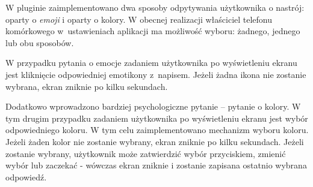 W pluginie zaimplementowano dwa sposoby odpytywania użytkownika o nastrój: oparty o \textit{emoji} i oparty o kolory. W obecnej realizacji właściciel telefonu komórkowego w~ustawieniach aplikacji ma możliwość wyboru: żadnego, jednego lub obu sposobów.

W przypadku pytania o emocje zadaniem użytkownika po wyświetleniu ekranu jest kliknięcie odpowiedniej emotikony z~napisem. Jeżeli żadna ikona nie zostanie wybrana, ekran zniknie po kilku sekundach.

Dodatkowo wprowadzono bardziej psychologiczne pytanie -- pytanie o kolory. W tym drugim przypadku zadaniem użytkownika po wyświetleniu ekranu jest wybór odpowiedniego koloru. W tym celu zaimplementowano mechanizm wyboru koloru. Jeżeli żaden kolor nie zostanie wybrany, ekran zniknie po kilku sekundach. Jeżeli zostanie wybrany, użytkownik może zatwierdzić wybór przyciskiem, zmienić wybór lub zaczekać - wówczas ekran zniknie i zostanie zapisana ostatnio wybrana odpowiedź.

